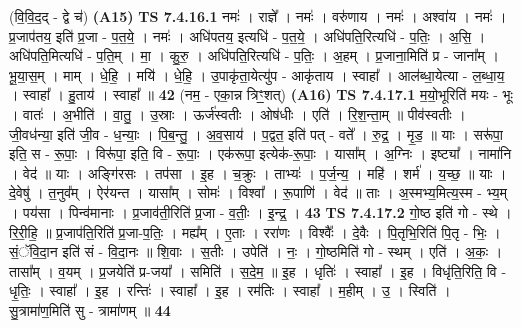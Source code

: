 \documentclass[17pt]{extarticle}
\begin{document}
                  \newline
                      (वि॒वि॒द॒द् - द्वे च॑)  \textbf{(A15)} \newline \newline
                                \textbf{ TS 7.4.16.1} \newline
                  नमः॑ । राज्ञे᳚ । नमः॑ । वरु॑णाय । नमः॑ । अश्वा॑य । नमः॑ । प्र॒जाप॑तय॒ इति॑ प्र॒जा - प॒त॒ये॒ । नमः॑ । अधि॑पतय॒ इत्यधि॑ - प॒त॒ये॒ । अधि॑पति॒रित्यधि॑ - प॒तिः॒ । अ॒सि॒ । अधि॑पति॒मित्यधि॑ - प॒ति॒म् । मा॒ । कु॒रु॒ । अधि॑पति॒रित्यधि॑ - प॒तिः॒ । अ॒हम् । प्र॒जाना॒मिति॑ प्र - जाना᳚म् । भू॒या॒स॒म् । माम् । धे॒हि॒ । मयि॑ । धे॒हि॒ । उ॒पाकृ॑ता॒येत्यु॑प - आकृ॑ताय । स्वाहा᳚ । आल॑ब्धा॒येत्या - ल॒ब्धा॒य॒ । स्वाहा᳚ । हु॒ताय॑ । स्वाहा᳚ ॥ \textbf{  42} \newline
                  \newline
                      (नम॒ - एका॒न्न त्रिꣳ॒॒शत्)  \textbf{(A16)} \newline \newline
                                \textbf{ TS 7.4.17.1} \newline
                  म॒यो॒भूरिति॑ मयः - भूः । वातः॑ । अ॒भीति॑ । वा॒तु॒ । उ॒स्राः । ऊर्ज॑स्वतीः । ओष॑धीः । एति॑ । रि॒श॒न्ता॒म् ॥ पीव॑स्वतीः । जी॒वध॑न्या॒ इति॑ जी॒व - ध॒न्याः॒ । पि॒ब॒न्तु॒ । अ॒व॒साय॑ । प॒द्वत॒ इति॑ पत् - वते᳚ । रु॒द्र॒ । मृ॒ड॒ ॥ याः । सरू॑पा॒ इति॒ स - रू॒पाः॒ । विरू॑पा॒ इति॒ वि - रू॒पाः॒ । एक॑रूपा॒ इत्येक॑-रू॒पाः॒ । यासा᳚म् । अ॒ग्निः । इष्ट्या᳚ । नामा॑नि । वेद॑ ॥ याः । अङ्गि॑रसः । तप॑सा । इ॒ह । च॒क्रुः । ताभ्यः॑ । प॒र्ज॒न्य॒ । महि॑ । शर्म॑ । य॒च्छ॒ ॥ याः । दे॒वेषु॑ । त॒नुव᳚म् । ऐर॑यन्त । यासा᳚म् । सोमः॑ । विश्वा᳚ । रू॒पाणि॑ । वेद॑ ॥ ताः । अ॒स्मभ्य॒मित्य॒स्म - भ्य॒म् । पय॑सा । पिन्व॑मानाः । प्र॒जाव॑ती॒रिति॑ प्र॒जा - व॒तीः॒ । इ॒न्द्र॒ । \textbf{  43} \newline
                  \newline
                                \textbf{ TS 7.4.17.2} \newline
                  गो॒ष्ठ इति॑ गो - स्थे । रि॒री॒हि॒ ॥ प्र॒जाप॑ति॒रिति॑ प्र॒जा-प॒तिः॒ । मह्य᳚म् । ए॒ताः । ररा॑णः । विश्वैः᳚ । दे॒वैः । पि॒तृभि॒रिति॑ पि॒तृ - भिः॒ । सं॒ॅवि॒दा॒न इति॑ सं - वि॒दा॒नः ॥ शि॒वाः । स॒तीः । उपेति॑ । नः॒ । गो॒ष्ठमिति॑ गो - स्थम् । एति॑ । अ॒कः॒ । तासा᳚म् । व॒यम् । प्र॒जयेति॑ प्र-जया᳚ । समिति॑ । स॒दे॒म॒ ॥ इ॒ह । धृतिः॑ । स्वाहा᳚ । इ॒ह । विधृ॑ति॒रिति॒ वि - धृ॒तिः॒ । स्वाहा᳚ । इ॒ह । रन्तिः॑ । स्वाहा᳚ । इ॒ह । रम॑तिः । स्वाहा᳚ । म॒हीम् । उ॒ । स्विति॑ । सु॒त्रामा॑ण॒मिति॑ सु - त्रामा॑णम् ॥ \textbf{  44 } \newline
\end{document}
